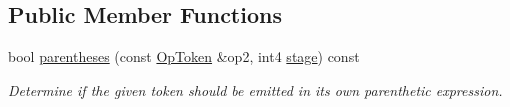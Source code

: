\subsection*{Public Member Functions}
\begin{DoxyCompactItemize}
\item 
bool \mbox{\hyperlink{class_op_token_a9a669c405e1e6968ec26045f823df46a}{parentheses}} (const \mbox{\hyperlink{class_op_token}{Op\+Token}} \&op2, int4 \mbox{\hyperlink{class_op_token_a542686a26ddc09726ca70ec466d4f7f8}{stage}}) const
\begin{DoxyCompactList}\small\item\em Determine if the given token should be emitted in its own parenthetic expression. \end{DoxyCompactList}\end{DoxyCompactItemize}
